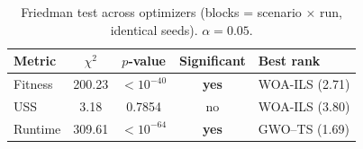 
\begin{table}[t]
  \centering
  \caption{Friedman test across optimizers (blocks = scenario $\times$ run, identical seeds). $\alpha = 0.05$.}
  \label{tab:friedman}
  \begin{tabular}{@{}l c c c l@{}}
    \toprule
    \textbf{Metric} & $\chi^2$ & \textbf{$p$-value} & \textbf{Significant} & \textbf{Best rank} \\
    \midrule
    Fitness & 200.23 & $<10^{-40}$ & \textbf{yes} & WOA-ILS (2.71) \\
    USS & 3.18 & 0.7854 & no & WOA-ILS (3.80) \\
    Runtime & 309.61 & $<10^{-64}$ & \textbf{yes} & GWO--TS (1.69) \\
    \bottomrule
  \end{tabular}
\end{table}

